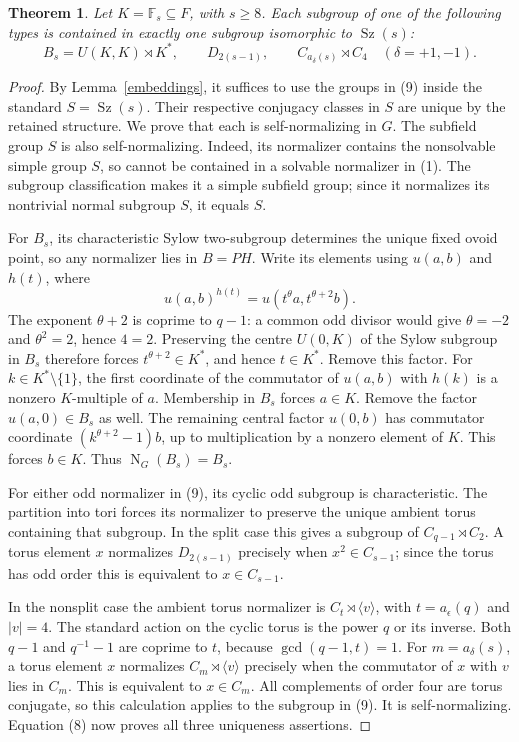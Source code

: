 \documentclass[11pt,a4paper]{article}
\newtheorem{theorem}{Theorem}
\newcommand{\F}{\mathbb F}
\newcommand{\Sz}{\operatorname{Sz}}
\newcommand{\gen}[1]{\langle #1\rangle}
\newcommand{\N}{\operatorname{N}}
\begin{document}
\begin{theorem}\label{unique}
Let $K=\F_s\subseteq F$, with $s\ge8$. Each subgroup of one
of the following types is contained in exactly one subgroup
isomorphic to $\Sz(s)$:
\[
 B_s=U(K,K)\rtimes K^*,\qquad
 D_{2(s-1)},\qquad C_{a_\delta(s)}\rtimes C_4
 \quad(\delta=+1,-1).
                                                        \tag{9}
\]
\end{theorem}
\begin{proof}
By Lemma~\ref{embeddings}, it suffices to use the groups in (9)
inside the standard $S=\Sz(s)$.
Their respective conjugacy classes in $S$ are unique by the
retained structure. We prove that each is self-normalizing in
$G$. The subfield group $S$ is also self-normalizing. Indeed,
its normalizer contains the nonsolvable simple group $S$, so
cannot be contained in a solvable normalizer in (1). The subgroup
classification makes it a simple subfield group; since it
normalizes its nontrivial normal subgroup $S$, it equals $S$.

For $B_s$, its characteristic Sylow two-subgroup determines the
unique fixed ovoid point, so any normalizer lies in $B=PH$.
Write its elements using $u(a,b)$ and $h(t)$, where
\[
 u(a,b)^{h(t)}=u(t^\theta a,t^{\theta+2}b).
                                                        \tag{10}
\]
The exponent $\theta+2$ is coprime to $q-1$: a common odd
divisor would give $\theta=-2$ and $\theta^2=2$, hence $4=2$.
Preserving the centre $U(0,K)$ of the Sylow subgroup in $B_s$
therefore forces $t^{\theta+2}\in K^*$, and hence $t\in K^*$.
Remove this factor. For $k\in K^*\setminus\{1\}$, the first
coordinate of the commutator of $u(a,b)$ with $h(k)$ is a
nonzero $K$-multiple of $a$. Membership in $B_s$ forces $a\in K$.
Remove the factor $u(a,0)\in B_s$ as well. The remaining central
factor $u(0,b)$ has commutator coordinate
$(k^{\theta+2}-1)b$, up to multiplication by a nonzero element
of $K$. This forces $b\in K$. Thus $\N_G(B_s)=B_s$.

For either odd normalizer in (9), its cyclic odd subgroup is
characteristic. The partition into tori forces its normalizer
to preserve the unique ambient torus containing that subgroup.
In the split case this gives a subgroup of $C_{q-1}\rtimes C_2$.
A torus element $x$ normalizes $D_{2(s-1)}$ precisely when
$x^2\in C_{s-1}$; since the torus has odd order this is equivalent
to $x\in C_{s-1}$.

In the nonsplit case the ambient torus normalizer is $C_t\rtimes
\gen v$, with $t=a_\epsilon(q)$ and $|v|=4$. The standard
action on the cyclic torus is the power $q$ or its inverse.
Both $q-1$ and $q^{-1}-1$ are coprime to $t$, because
$\gcd(q-1,t)=1$. For $m=a_\delta(s)$, a torus element $x$
normalizes $C_m\rtimes\gen v$ precisely when the commutator
of $x$ with $v$ lies in $C_m$. This is equivalent to $x\in C_m$.
All complements of order four are torus conjugate, so this
calculation applies to the subgroup in (9). It is self-normalizing.
Equation (8) now proves all three uniqueness assertions.
\end{proof}
\end{document}
